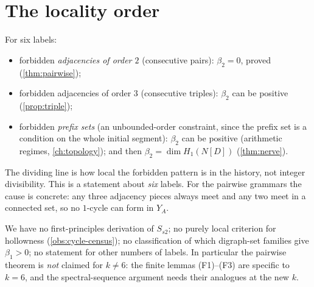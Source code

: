 \section{The locality order}
\begin{observation}\label{obs:locality}
For six labels:
\begin{itemize}[nosep]
\item forbidden \emph{adjacencies of order $2$} (consecutive pairs): $\beta_2=0$, proved (\cref{thm:pairwise});
\item forbidden adjacencies of order $3$ (consecutive triples): $\beta_2$ can be positive (\cref{prop:triple});
\item forbidden \emph{prefix sets} (an unbounded-order constraint, since the prefix set is a condition on the whole initial segment): $\beta_2$ can be positive (arithmetic regimes, \cref{ch:topology}); and then $\beta_2=\dim H_1(N[D])$ (\cref{thm:nerve}).
\end{itemize}
The dividing line is how local the forbidden pattern is in the history, not integer divisibility. This is a statement about \emph{six} labels. For the pairwise grammars the cause is concrete: any three adjacency pieces always meet and any two meet in a connected set, so no $1$-cycle can form in $Y_A$.
\end{observation}
\begin{remark}
We have no first-principles derivation of $S_{s2}$; no purely local criterion for hollowness (\cref{obs:cycle-census}); no classification of which digraph-set families give $\beta_1>0$; no statement for other numbers of labels. In particular the pairwise theorem is \emph{not} claimed for $k\ne6$: the finite lemmas (F1)--(F3) are specific to $k=6$, and the spectral-sequence argument needs their analogues at the new $k$.
\end{remark}

